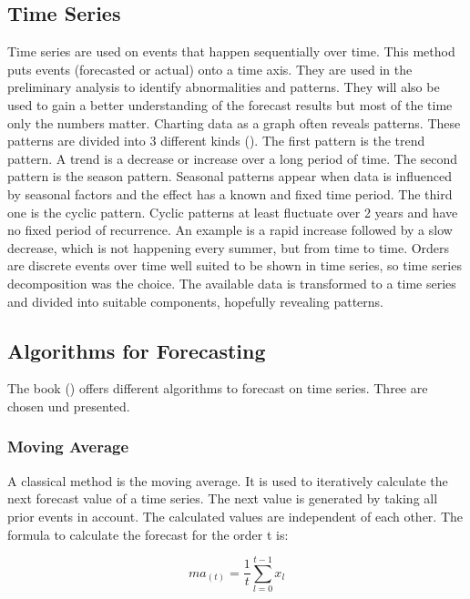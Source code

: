 \subsection{Time Series}\label{subsection:Time Series}
Time series are used on events that happen sequentially over time. This method puts events (forecasted or actual) onto a time axis.
They are used in the preliminary analysis to identify abnormalities and patterns. They will also be used to gain a better understanding of the forecast results but most of the time only the numbers matter. Charting data as a graph often reveals patterns. These patterns are divided into 3 different kinds (\cite{Hyndman.2013}). The first pattern is the trend pattern. A trend is a decrease or increase over a long period of time. The second pattern is the season pattern. Seasonal patterns appear when data is influenced by seasonal factors and the effect has a known and fixed time period. The third one is the cyclic pattern. Cyclic patterns at least fluctuate over 2 years and have no fixed period of recurrence. An example is a rapid increase followed by a slow decrease, which is not happening every summer, but from time to time.\newline
Orders are discrete events over time well suited to be shown in time series, so time series decomposition was the choice. The available data is transformed to a time series and divided into suitable components, hopefully revealing patterns.
\subsection{Algorithms for Forecasting}\label{subsection:Algorithms for Forecasting}
The book (\cite{Hyndman.2013}) offers different algorithms to forecast on time series. Three are chosen und presented.
\subsubsection{Moving Average}\label{subsubsection:Moving Average}
A classical method is the moving average. It is used to iteratively calculate the next forecast value of a time series. The next value is generated by taking all prior events in account. The calculated values are independent of each other.\newline
The formula to calculate the forecast for the order t is:
\begin{center}
\begin{equation}
ma_{(t)}= \frac{1}{t}\sum^{t-1}_{l = 0} x_{l}
\end{equation}
\end{center}

